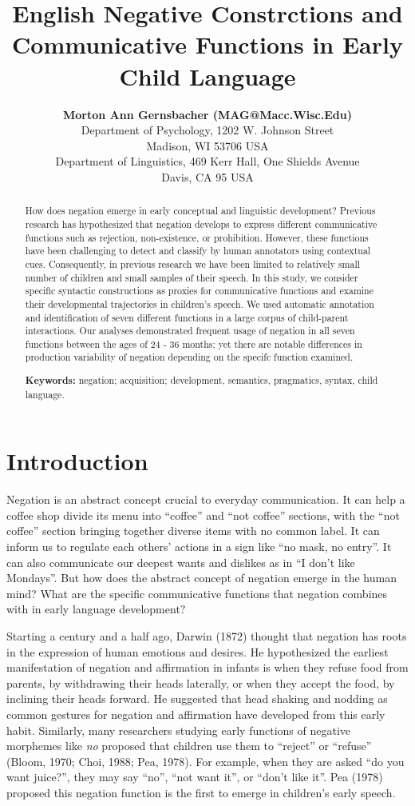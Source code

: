 \documentclass[10pt, letterpaper]{article}
\title{English Negative Constrctions and Communicative Functions in Early Child
Language}
\author{{\large \bf Morton Ann Gernsbacher (MAG@Macc.Wisc.Edu)} \\ Department of Psychology, 1202 W. Johnson Street \\ Madison, WI 53706 USA \AND {\large \bf Masoud Jasbi (jasbi@ucdavis.edu)} \\ Department of Linguistics, 469 Kerr Hall, One Shields Avenue \\ Davis, CA 95 USA}
\begin{document}
\maketitle

\begin{abstract}
How does negation emerge in early conceptual and linguistic development?
Previous research has hypothesized that negation develops to express
different communicative functions such as rejection, non-existence, or
prohibition. However, these functions have been challenging to detect
and classify by human annotators using contextual cues. Consequently, in
previous research we have been limited to relatively small number of
children and small samples of their speech. In this study, we consider
specific syntactic constructions as proxies for communicative functions
and examine their developmental trajectories in children's speech. We
used automatic annotation and identification of seven different
functions in a large corpus of child-parent interactions. Our analyses
demonstrated frequent usage of negation in all seven functions between
the ages of 24 - 36 months; yet there are notable differences in
production variability of negation depending on the specifc function
examined.

\textbf{Keywords:}
negation; acquisition; development, semantics, pragmatics, syntax, child
language.
\end{abstract}

\hypertarget{introduction}{%
\section{Introduction}\label{introduction}}

Negation is an abstract concept crucial to everyday communication. It
can help a coffee shop divide its menu into ``coffee'' and ``not
coffee'' sections, with the ``not coffee'' section bringing together
diverse items with no common label. It can inform us to regulate each
others' actions in a sign like ``no mask, no entry''. It can also
communicate our deepest wants and dislikes as in ``I don't like
Mondays''. But how does the abstract concept of negation emerge in the
human mind? What are the specific communicative functions that negation
combines with in early language development?

Starting a century and a half ago, Darwin (1872) thought that negation
has roots in the expression of human emotions and desires. He
hypothesized the earliest manifestation of negation and affirmation in
infants is when they refuse food from parents, by withdrawing their
heads laterally, or when they accept the food, by inclining their heads
forward. He suggested that head shaking and nodding as common gestures
for negation and affirmation have developed from this early habit.
Similarly, many researchers studying early functions of negative
morphemes like \emph{no} proposed that children use them to ``reject''
or ``refuse'' (Bloom, 1970; Choi, 1988; Pea, 1978). For example, when
they are asked ``do you want juice?'', they may say ``no'', ``not want
it'', or ``don't like it''. Pea (1978) proposed this negation function
is the first to emerge in children's early speech.
\end{document}
